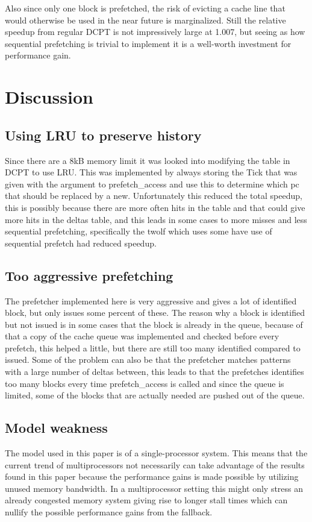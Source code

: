 \documentclass[12pt,journal,compsoc]{IEEEtran}
\begin{document}
Also since only one block is prefetched, the risk of evicting a cache line
that would otherwise be used in the near future is marginalized. Still the
relative speedup from regular DCPT is not impressively large at 1.007, but
seeing as how sequential prefetching is trivial to implement it is a
well-worth investment for performance gain.

\section{Discussion}
\subsection{Using LRU to preserve history}
Since there are a 8kB memory limit it was looked into modifying the table in DCPT to use LRU. This was implemented by always storing the Tick that was given with the argument to prefetch\_access and use this to determine which pc that should be replaced by a new. Unfortunately this reduced the total speedup, this is possibly because there are more often hits in the table and that could give more hits in the deltas table, and this leads in some cases to more misses and less sequential prefetching, specifically the twolf which uses some have use of sequential prefetch had reduced speedup.

\subsection{Too aggressive prefetching}
The prefetcher implemented here is very aggressive and gives a lot of identified block, but only issues some percent of these. The reason why a block is identified but not issued is in some cases that the block is already in the queue, because of that a copy of the cache queue was implemented and checked before every prefetch, this helped a little, but there are still too many identified compared to issued. Some of the problem can also be that the prefetcher matches patterns with a large number of deltas between, this leads to that the prefetches identifies too many blocks every time prefetch\_access is called and since the queue is limited, some of the blocks that are actually needed are pushed out of the queue. %

\subsection{Model weakness}
The model used in this paper is of a single-processor system.
This means that the current trend of multiprocessors not
necessarily can take advantage of the results found in
this paper because the performance gains is made possible
by utilizing unused memory bandwidth. In a multiprocessor
setting this might only stress an already congested memory
system giving rise to longer stall times which can nullify
the possible performance gains from the fallback.
\end{document}
